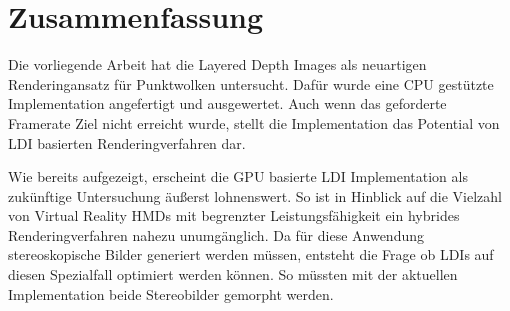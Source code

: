 \documentclass[hyperref, beleg, german]{cgvpub}
\begin{document}
\chapter{Zusammenfassung}

Die vorliegende Arbeit hat die Layered Depth Images als neuartigen
Renderingansatz für Punktwolken untersucht. Dafür wurde eine CPU gestützte
Implementation angefertigt und ausgewertet. Auch wenn das geforderte Framerate
Ziel nicht erreicht wurde, stellt die Implementation das Potential von LDI
basierten Renderingverfahren dar.

Wie bereits aufgezeigt, erscheint die GPU basierte LDI Implementation als
zukünftige Untersuchung äußerst lohnenswert. So ist in Hinblick auf die
Vielzahl von Virtual Reality HMDs mit begrenzter Leistungsfähigkeit ein
hybrides Renderingverfahren nahezu unumgänglich. Da für diese Anwendung
stereoskopische Bilder generiert werden müssen, entsteht die Frage ob LDIs auf
diesen Spezialfall optimiert werden können. So müssten mit der aktuellen
Implementation beide Stereobilder gemorpht werden.
\end{document}
